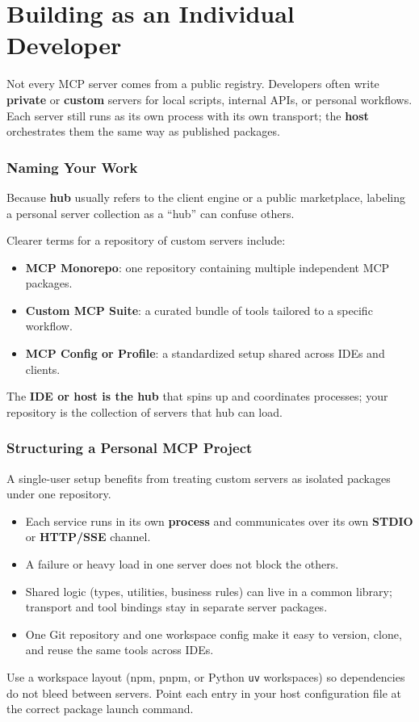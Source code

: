 \newpage
\part{Building as an Individual Developer}

Not every MCP server comes from a public registry.
Developers often write \textbf{private} or \textbf{custom} servers for local scripts, internal APIs, or personal workflows.
Each server still runs as its own process with its own transport; the \textbf{host} orchestrates them the same way as published packages.

\section{Naming Your Work}

Because \textbf{hub} usually refers to the client engine or a public marketplace, labeling a personal server collection as a ``hub'' can confuse others.

Clearer terms for a repository of custom servers include:

\begin{itemize}
  \item \textbf{MCP Monorepo}: one repository containing multiple independent MCP packages.
  \item \textbf{Custom MCP Suite}: a curated bundle of tools tailored to a specific workflow.
  \item \textbf{MCP Config or Profile}: a standardized setup shared across IDEs and clients.
\end{itemize}

\noindent
The \textbf{IDE or host is the hub} that spins up and coordinates processes; your repository is the collection of servers that hub can load.

\section{Structuring a Personal MCP Project}

A single-user setup benefits from treating custom servers as isolated packages under one repository.

\begin{itemize}
  \item Each service runs in its own \textbf{process} and communicates over its own \textbf{STDIO} or \textbf{HTTP/SSE} channel.
  \item A failure or heavy load in one server does not block the others.
  \item Shared logic (types, utilities, business rules) can live in a common library; transport and tool bindings stay in separate server packages.
  \item One Git repository and one workspace config make it easy to version, clone, and reuse the same tools across IDEs.
\end{itemize}

Use a workspace layout (npm, pnpm, or Python \lstinline[style=inline]|uv| workspaces) so dependencies do not bleed between servers.
Point each entry in your host configuration file at the correct package launch command.
